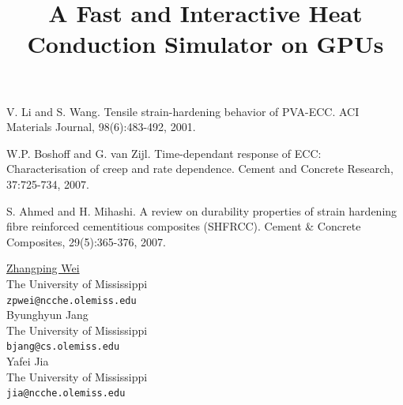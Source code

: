 \documentclass[article, A4, 11pt]{llncs}%
\begin{document}

\begin{thebibliography}{10}
{\sc V. Li and S. Wang}. {Tensile strain-hardening behavior of PVA-ECC}. ACI Materials Journal, 98(6):483-492, 2001.

{\sc W.P. Boshoff and G. van Zijl}. {Time-dependant response of ECC: Characterisation of creep and rate dependence}. Cement and Concrete Research, 37:725-734, 2007.

{\sc S. Ahmed and H. Mihashi}. {A review on durability properties of strain hardening fibre reinforced cementitious composites (SHFRCC)}. Cement \& Concrete Composites, 29(5):365-376, 2007.
\end{thebibliography} %

\title{A Fast and Interactive Heat Conduction Simulator on GPUs}
 \author{} \institute{}
\maketitle
\begin{center}
{\large \underline{Zhangping Wei}}\\
The University of Mississippi\\
{\tt zpwei@ncche.olemiss.edu}
\\ \vspace{4mm}
{\large Byunghyun Jang}\\
The University of Mississippi\\
{\tt bjang@cs.olemiss.edu}
\\ \vspace{4mm}
{\large Yafei Jia}\\
The University of Mississippi\\
{\tt jia@ncche.olemiss.edu}
\end{center}
\end{document}
